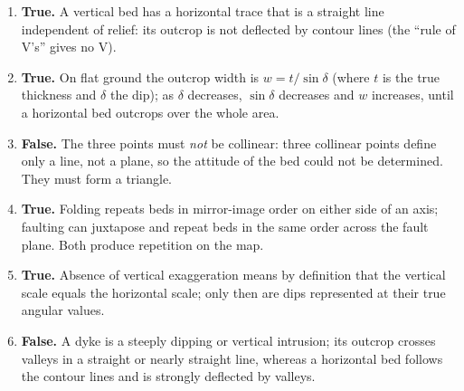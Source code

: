 \documentclass[11pt]{article}
\newcommand{\cle}[1]{{\popxbold\color{popdark}#1}}
\begin{document}
\begin{corrige}
\begin{enumerate}
\item \textbf{True.} A \cle{vertical bed} has a horizontal trace that is a straight line independent of relief: its outcrop is not deflected by contour lines (the ``rule of V's'' gives no V).
\item \textbf{True.} On flat ground the outcrop width is $w = t/\sin\delta$ (where $t$ is the \cle{true thickness} and $\delta$ the dip); as $\delta$ decreases, $\sin\delta$ decreases and $w$ increases, until a horizontal bed outcrops over the whole area.
\item \textbf{False.} The three points must \emph{not} be collinear: three collinear points define only a line, not a plane, so the attitude of the bed could not be determined. They must form a triangle.
\item \textbf{True.} \cle{Folding} repeats beds in mirror-image order on either side of an axis; \cle{faulting} can juxtapose and repeat beds in the same order across the fault plane. Both produce repetition on the map.
\item \textbf{True.} Absence of \cle{vertical exaggeration} means by definition that the vertical scale equals the horizontal scale; only then are dips represented at their true angular values.
\item \textbf{False.} A \cle{dyke} is a steeply dipping or vertical intrusion; its outcrop crosses valleys in a straight or nearly straight line, whereas a horizontal bed follows the contour lines and is strongly deflected by valleys.
\end{enumerate}
\end{corrige}
\end{document}
